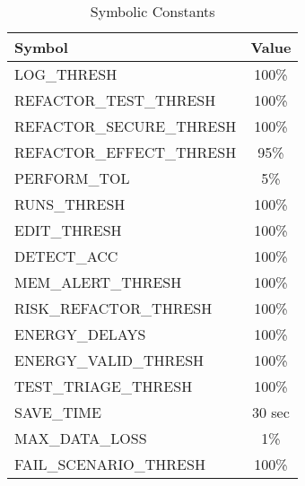 \documentclass{article}
\begin{document}
\begin{table}[H]
    \centering
    \renewcommand{\arraystretch}{1.2}
    \begin{tabular}{|l|c|}
        \toprule \textbf{Symbol} & \textbf{Value} \\
        \midrule
        LOG\_THRESH & 100\% \\
        REFACTOR\_TEST\_THRESH & 100\% \\
        REFACTOR\_SECURE\_THRESH & 100\% \\
        REFACTOR\_EFFECT\_THRESH & 95\% \\
        PERFORM\_TOL & 5\% \\
        RUNS\_THRESH & 100\% \\
        EDIT\_THRESH & 100\% \\
        DETECT\_ACC & 100\% \\
        MEM\_ALERT\_THRESH & 100\% \\
        RISK\_REFACTOR\_THRESH & 100\% \\
        ENERGY\_DELAYS & 100\% \\
        ENERGY\_VALID\_THRESH & 100\% \\
        TEST\_TRIAGE\_THRESH & 100\% \\
        SAVE\_TIME & 30 sec \\
        MAX\_DATA\_LOSS & 1\% \\
        FAIL\_SCENARIO\_THRESH & 100\% \\
        \bottomrule
    \end{tabular}
    \caption{Symbolic Constants}
    \label{tab:sym}
\end{table}
\end{document}
